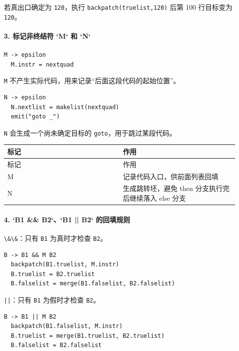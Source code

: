 \documentclass[UTF8]{ctexart}
\begin{document}
若真出口确定为 \texttt{120}，执行 \texttt{backpatch(truelist,120)} 后第 100 行目标变为 \texttt{120}。

\paragraph*{3. 标记非终结符 `M` 和 `N`}

\begin{Verbatim}[fontsize=\small,breaklines=true]
M -> epsilon
  M.instr = nextquad
\end{Verbatim}

\texttt{M} 不产生实际代码，用来记录“后面这段代码的起始位置”。

\begin{Verbatim}[fontsize=\small,breaklines=true]
N -> epsilon
  N.nextlist = makelist(nextquad)
  emit("goto _")
\end{Verbatim}

\texttt{N} 会生成一个尚未确定目标的 \texttt{goto}，用于跳过某段代码。

\begin{longtable}{|p{0.47\linewidth}|p{0.47\linewidth}|}
\hline
标记 & 作用 \\
\hline
\endfirsthead
标记 & 作用 \\
\hline
\endhead
M & 记录代码入口，供前面列表回填 \\
\hline
N & 生成跳转坯，避免 then 分支执行完后继续落入 else 分支 \\
\hline
\end{longtable}

\paragraph*{4. `B1 \&\& B2`、`B1 || B2` 的回填规则}

\texttt{\textbackslash{}\&\textbackslash{}\&}：只有 \texttt{B1} 为真时才检查 \texttt{B2}。

\begin{Verbatim}[fontsize=\small,breaklines=true]
B -> B1 && M B2
  backpatch(B1.truelist, M.instr)
  B.truelist = B2.truelist
  B.falselist = merge(B1.falselist, B2.falselist)
\end{Verbatim}

\texttt{||}：只有 \texttt{B1} 为假时才检查 \texttt{B2}。

\begin{Verbatim}[fontsize=\small,breaklines=true]
B -> B1 || M B2
  backpatch(B1.falselist, M.instr)
  B.truelist = merge(B1.truelist, B2.truelist)
  B.falselist = B2.falselist
\end{Verbatim}
\end{document}

